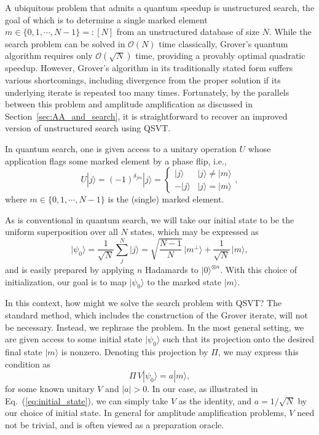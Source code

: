 \documentclass[aps,pra,showpacs,notitlepage,twocolumn,superscriptaddress,nofootinbib]{revtex4-1}
\begin{document}
    A ubiquitous problem that admits a quantum speedup is unstructured search, the goal of which is to determine a single marked element $m \in \{0, 1, \cdots, N - 1\} =: [N]$ from an unstructured database of size $N$. While the search problem can be solved in $\mathcal{O}(N)$ time classically, Grover's quantum algorithm requires only $\mathcal{O}(\sqrt{N})$ time, providing a provably optimal quadratic speedup. However, Grover's algorithm in its traditionally stated form suffers various shortcomings, including divergence from the proper solution if its underlying iterate is repeated too many times. Fortunately, by the parallels between this problem and amplitude amplification as discussed in Section~\ref{sec:AA_and_search}, it is straightforward to recover an improved version of unstructured search using QSVT.
    
    In quantum search, one is given access to a unitary operation $U$ whose application flags some marked element by a phase flip, i.e.,
        \begin{equation} \label{eq:oracle_action}
            U|j\rangle = (-1)^{\delta_{jm}}|j\rangle = \begin{cases}
                |j\rangle & |j\rangle \neq |m\rangle \\
                -|j\rangle & |j\rangle = |m\rangle
            \end{cases},
        \end{equation}
    where $m \in \{0, 1, \cdots, N - 1\}$ is the (single) marked element. 
    
    As is conventional in quantum search, we will take our initial state to be the uniform superposition over all $N$ states, which may be expressed as
    \begin{equation}\label{eq:initial_state}
            \lvert \psi_0 \rangle = \frac{1}{\sqrt{N}} \sum_j^N |j\rangle = \sqrt{\frac{N - 1}{N}}\,\lvert m^\perp\rangle + \frac{1}{\sqrt{N}}\,\lvert m \rangle,
    \end{equation}
    and is easily prepared by applying $n$ Hadamards to $|0\rangle^{\otimes n}$. With this choice of initialization, our goal is to map $|\psi_0\rangle$ to the marked state $|m\rangle$.
    
    In this context, how might we solve the search problem with QSVT? The standard method, which includes the construction of the Grover iterate, will not be necessary. Instead, we rephrase the problem. In the most general setting, we are given access to some initial state $|\psi_0\rangle$ such that its projection onto the desired final state $|m\rangle$ is nonzero. Denoting this projection by $\Pi$, we may express this condition as
        \begin{equation}
            \Pi\, V |\psi_0 \rangle = a |m\rangle,
        \end{equation}
    for some known unitary $V$ and $|a| > 0$. In our case, as illustrated in Eq.~(\ref{eq:initial_state}), we can simply take $V$ as the identity, and $a = 1/\sqrt{N}$ by our choice of initial state. In general for amplitude amplification problems, $V$ need not be trivial, and is often viewed as a preparation oracle.
    
\end{document}
